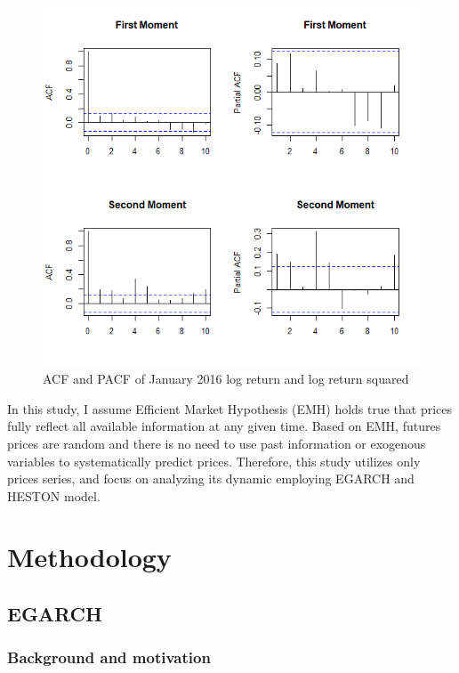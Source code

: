 \documentclass[12pt,a4paper]{article}
\numberwithin{equation}{section}
\begin{document}
\begin{figure}[h!] 
\includegraphics[scale=1,width=1\linewidth,height=0.4\textheight]{Jan16_pacf.png}
\caption{ACF and PACF of January 2016 log return and log return squared}
\label{Jan16pacf}
\end{figure}

In this study, I assume Efficient Market Hypothesis (EMH) holds true that prices fully reflect all available information at any given time. Based on EMH, futures prices are random and there is no need to use past information or exogenous variables to systematically predict prices. Therefore, this study utilizes only prices series, and focus on analyzing its dynamic employing EGARCH and HESTON model.

\section{Methodology}

\subsection{EGARCH}


\subsubsection{Background and motivation}
\end{document}
